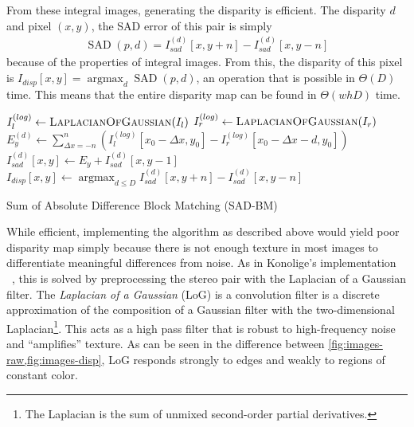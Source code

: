 \documentclass{article}
\let\orgautoref\autoref
\providecommand{\Cref}
        {\def\equationautorefname{Equation}%
         \def\figureautorefname{Figure}%
         \def\subfigureautorefname{Figure}%
         \def\Itemautorefname{Item}%
         \def\tableautorefname{Table}%
         \def\sectionautorefname{Section}%
         \def\subsectionautorefname{Section}%
         \def\subsubsectionautorefname{Section}%
         \def\chapterautorefname{Section}%
         \def\partautorefname{Part}%
         \orgautoref}
\newcommand{\proc}[1]{\textnormal{\scshape#1}}
\DeclareMathOperator*{\argmin}{argmax}
\DeclareMathOperator{\LoG}{\proc{LaplacianOfGaussian}}
\DeclareMathOperator{\SAD}{SAD}
\begin{document}
From these integral images, generating the disparity is efficient. The
disparity $d$ and pixel $(x, y)$, the SAD error of this pair is simply
\begin{align*}
    \SAD(p, d) = I_{sad}^{(d)}[x, y + n] - I_{sad}^{(d)}[x, y - n]
\end{align*}
because of the properties of integral images. From this, the disparity of this
pixel is $I_{disp}[x, y] = \argmin_{d} \SAD(p, d)$, an operation that is
possible in $\Theta(D)$ time. This means that the entire disparity map can be
found in $\Theta(whD)$ time.

\begin{algorithm}[t]
    $I_l^{(log)} \gets \LoG(I_l)$ \;
    $I_r^{(log)} \gets \LoG(I_r)$ \;
     {
         {
            $E_y^{(d)} \gets \sum_{\Delta x = -n}^n \left(
                          I_l^{(log)}[x_0 - \Delta x, y_0]
                          - I_r^{(log)}[x_0 - \Delta x - d, y_0] \right)$ \;
            $I_{sad}^{(d)}[x, y] \gets E_y + I_{sad}^{(d)}[x, y - 1]$ \;
        }
    }
     {
        $I_{disp}[x, y] \gets \argmin_{d \le D} I_{sad}^{(d)}[x, y + n] - I_{sad}^{(d)}[x, y - n]$ \;
    }
    \caption{Sum of Absolute Difference Block Matching (SAD-BM)}
    \label{alg:serial}
\end{algorithm}

While efficient, implementing the algorithm as described above would yield poor
disparity map simply because there is not enough texture in most images to
differentiate meaningful differences from noise. As in Konolige's
implementation ~\cite{konolige97}, this is solved by preprocessing the stereo
pair with the Laplacian of a Gaussian filter. The \textit{Laplacian of a
Gaussian} (LoG) is a convolution filter is a discrete approximation of the
composition of a Gaussian filter with the two-dimensional
Laplacian\footnote{The Laplacian is the sum of unmixed second-order partial
derivatives.}. This acts as a high pass filter that is robust to high-frequency
noise and ``amplifies'' texture. As can be seen in the difference between
\Cref{fig:images-raw,fig:images-disp}, LoG responds strongly to edges and
weakly to regions of constant color.
\end{document}
